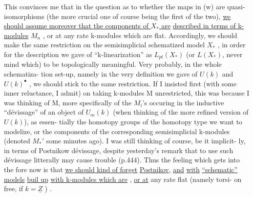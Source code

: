This convinces me that in the question as to whether the maps in (w)
are quasi-isomorphisms (the more crucial one of course being the first
of the two), \uline{we should assume moreover that the components of $X_*$ are}
\uline{described in terms of }\uline{ k-modules} $M_n$ , or at any rate k-modules
which are flat. Accordingly, we should make the same restriction on
the semisimplicial schematized model $X_*$ , in order for the description
we gave of ``k-linearization'' as $L_{pt}(X_*)$ (or $L(X_*)$, never mind which)
to be topologically meaningful. Very probably, in the whole schematiza-%
tion set-up, namely in the very definition we gave of $U(k)$ and $U(k)^\bullet$ ,
we should stick to the same restriction. If  I insisted
first (with some inner reluctance, I admit) on taking k-modules M
unrestricted, this was because I was thinking of M, more specifically
of the $M_i$'s occuring in the inductive ``dévissage'' of an object of
$U_m(k)$ (when thinking of the more refined version of $U(k)$), as essen-%
tially the homotopy groups of the homotopy type we want to modelize,
or  the components of the corresponding semisimplicial k-modules (denoted
$M_*'$ some minutes ago). I was still thinking of course, be it implicit-%
ly, in terms of Postnikow dévissage, despite yesterday's remark that
to use such dévissage litterally may cause trouble (p.444). Thus the
feeling which gets into the fore now is that \uline{we should kind of forget}
\uline{Postnikov}, \uline{and}   \uline{with} \uline{} \uline{``schematic''} \uline{models} \uline{buil up}
\uline{with k-modules which are} , \uline{or at} any rate flat (namely torsi-%
on free, if $k=\underline{Z}$ ) .


